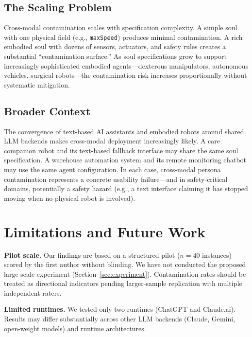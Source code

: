 \documentclass[manuscript,screen,nonacm]{acmart}
\begin{document}
\subsection{The Scaling Problem}

Cross-modal contamination scales with specification complexity.
A simple soul with one physical field (e.g., \texttt{maxSpeed}) produces minimal contamination.
A rich embodied soul with dozens of sensors, actuators, and safety rules creates a substantial ``contamination surface.''
As soul specifications grow to support increasingly sophisticated embodied agents---dexterous manipulators, autonomous vehicles, surgical robots---the contamination risk increases proportionally without systematic mitigation.

\subsection{Broader Context}

The convergence of text-based AI assistants and embodied robots around shared LLM backends makes cross-modal deployment increasingly likely.
A care companion robot and its text-based fallback interface may share the same soul specification.
A warehouse automation system and its remote monitoring chatbot may use the same agent configuration.
In each case, cross-modal persona contamination represents a concrete usability failure---and in safety-critical domains, potentially a safety hazard (e.g., a text interface claiming it has stopped moving when no physical robot is involved).


\section{Limitations and Future Work}
\label{sec:limitations}

\textbf{Pilot scale.}
Our findings are based on a structured pilot ($n=40$ instances) scored by the first author without blinding.
We have not conducted the proposed large-scale experiment (Section~\ref{sec:experiment}).
Contamination rates should be treated as directional indicators pending larger-sample replication with multiple independent raters.

\textbf{Limited runtimes.}
We tested only two runtimes (ChatGPT and Claude.ai).
Results may differ substantially across other LLM backends (Claude, Gemini, open-weight models) and runtime architectures.
\end{document}
